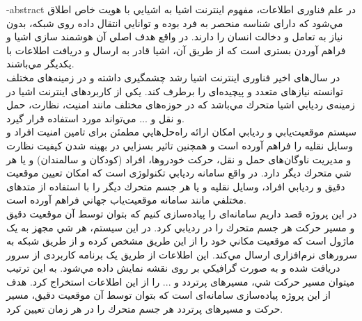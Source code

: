 
 
\surname{}

\fa-abstract{
در علم فناوری اطلاعات، مفهوم اينترنت اشيا به اشيايي با هويت خاص اطلاق مي‌شود كه دارای شناسه منحصر به فرد بوده و توانايي انتقال داده روی شبکه، بدون نياز به تعامل و دخالت انسان را دارند. در واقع هدف اصلي آن هوشمند سازی اشيا و فراهم آوردن بستری است كه از طريق آن،
اشيا قادر به ارسال و دريافت اطلاعات با يکديگر مي‌باشند.
\\
در سال‌های اخير فناوری اينترنت اشيا رشد چشمگيری داشته و در زمينه‌های مختلف توانسته نيازهای متعدد و پيچيده‌ای را برطرف كند. يکي از كاربردهای اينترنت اشيا در زمينه‌ی ‌‌رديابي اشيا متحرك مي‌باشد كه در حوزه‌های مختلف مانند امنيت، نظارت، حمل و نقل و ... مي‌تواند مورد استفاده قرار گيرد.
\\
سيستم موقعيت‌يابي و رديابي امکان ارائه راه‌حل‌هايي مطمئن برای تامين امنيت افراد و وسايل نقليه را فراهم آورده است و همچنين تاثير بسزايي در بهينه شدن كيفيت نظارت و مديريت ناوگان‌های حمل و نقل، حركت خودروها، افراد (کودکان و سالمندان) و يا هر شي متحرك ديگر دارد. در واقع سامانه رديابي تکنولوژی است كه امکان تعيين موقعيت دقيق و رديابي افراد، وسايل نقليه و يا هر جسم متحرك ديگر را با استفاده از متدهای مختلفي مانند
سامانه موقعيت‌ياب جهاني فراهم آورده است.
\\
در اين پروژه قصد داريم سامانه‌ای را پياده‌سازی كنيم كه بتوان توسط آن موقعيت دقيق و مسير حركت هر جسم متحرك را در رديابي كرد. در اين سيستم، هر شي مجهز به يک ماژول  است كه موقعيت مکاني خود را از این طریق مشخص کرده و از طريق شبکه  به سرورهای نرم‌افزاری ارسال مي‌كند. اين اطلاعات از طريق يک برنامه كاربردی از سرور دريافت شده و به صورت گرافيکي بر روی نقشه نمايش داده مي‌شود. به اين ترتيب ميتوان مسير حركت
شي، مسيرهای پرتردد و ... را از اين اطلاعات استخراج كرد.
هدف از این پروژه پياده‌سازی سامانه‌ای است كه بتوان توسط آن موقعيت دقيق، مسير حركت و مسیرهای پرتردد هر جسم متحرك را در هر زمان تعيين كرد.
}


